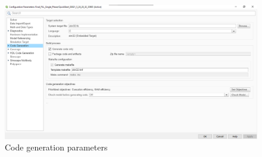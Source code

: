 \begin{figure}
    \centering
    \includegraphics[width=1.0\textwidth]{Code generation.png}
    \caption{Code generation parameters}
    \label{Code generation.png}
\end{figure}